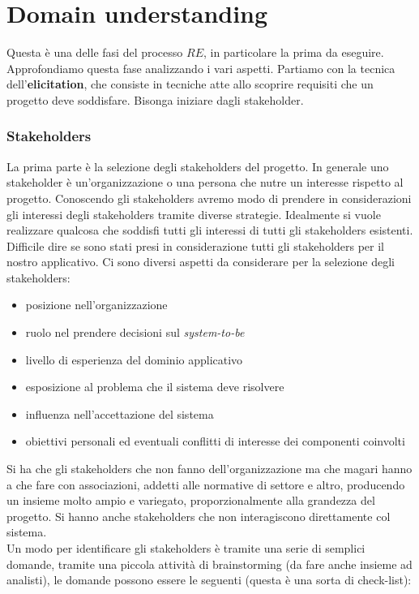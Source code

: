 \section{Domain understanding}
Questa è una delle fasi del processo $RE$, in particolare la prima da eseguire.\\
Approfondiamo questa fase analizzando i vari aspetti. Partiamo con la tecnica dell'\textbf{elicitation}, che consiste in tecniche atte allo scoprire requisiti che un progetto deve soddisfare. Bisonga iniziare dagli stakeholder.
\subsubsection{Stakeholders}
La prima parte è la selezione degli stakeholders del progetto.  In generale uno stakeholder è un'organizzazione o una persona che nutre un interesse rispetto al progetto. Conoscendo gli stakeholders avremo modo di prendere in considerazioni gli interessi degli stakeholders tramite diverse strategie. Idealmente si vuole realizzare qualcosa che soddisfi tutti gli interessi di tutti gli stakeholders esistenti. Difficile dire se sono stati presi in considerazione tutti gli stakeholders per il nostro applicativo.
Ci sono diversi aspetti da considerare per la selezione degli stakeholders:
\begin{itemize}
  \item posizione nell'organizzazione
  \item ruolo nel prendere decisioni sul \textit{system-to-be}
  \item livello di esperienza del dominio applicativo
  \item esposizione al problema che il sistema deve risolvere
  \item influenza nell'accettazione del sistema
  \item obiettivi personali ed eventuali conflitti di interesse dei componenti coinvolti 
\end{itemize}
Si ha che gli stakeholders che non fanno dell'organizzazione ma che magari hanno a che fare con associazioni, addetti alle normative di settore e altro, producendo un insieme molto ampio e variegato, proporzionalmente alla grandezza del progetto. Si hanno anche stakeholders che non interagiscono direttamente col sistema.\\ 
Un modo per identificare gli stakeholders è tramite una serie di semplici domande, tramite una piccola attività di brainstorming (da fare anche insieme ad analisti), le domande possono essere le seguenti (questa è una sorta di check-list):
